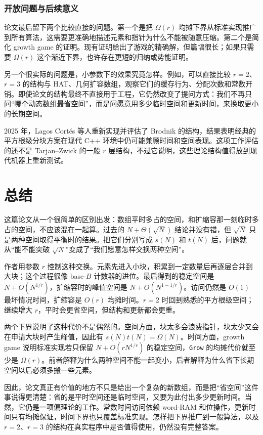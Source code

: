 \documentclass[12pt,a4paper]{article}
\begin{document}
\subsubsection{开放问题与后续意义}

论文最后留下两个比较直接的问题\cite{tarjan2023optimalresizablearrays}。第一个是把 $\Omega(r)$ 均摊下界从标准实现推广到所有算法，这需要更准确地描述元素和指针为什么不能被随意压缩。第二个是简化 growth game 的证明。现有证明给出了游戏的精确解，但篇幅很长；如果只需要 $\Omega(r)$ 这个渐近下界，也许存在更短的归纳或势能证明。

另一个很实际的问题是，小参数下的效果究竟怎样。例如，可以直接比较 $r=2$、$r=3$ 的结构与 HAT、几何扩容数组，观察它们的缓存行为、分配次数和常数开销。即使论文的结构最终不直接用于工程，它仍然改变了提问方式：我们不再只问“哪个动态数组最省空间”，而是问愿意用多少临时空间和更新时间，来换取更小的长期空间。

2025 年，Lagos Cortés 等人重新实现并评估了 Brodnik 的结构，结果表明经典的平方根级分块方案在现代 C++ 环境中仍可能兼顾时间和空间表现\cite{lagos2025brodnik}。这项工作评估的还不是 Tarjan--Zwick 的一般 $r$ 层结构，不过它说明，这些理论结构值得放到现代机器上重新测试。


\section{总结}

这篇论文从一个很简单的区别出发：数组平时多占的空间，和扩缩容那一刻临时多占的空间，不应该混在一起算。过去的 $N+\Theta(\sqrt{N})$ 结论并没有错，但 $\sqrt{N}$ 只是两种空间取得平衡时的结果。把它们分别写成 $s(N)$ 和 $t(N)$ 后，问题就从“能不能突破 $\sqrt{N}$”变成了“我们愿意怎样交换两种空间”\cite{tarjan2023optimalresizablearrays}。

作者用参数 $r$ 控制这种交换。元素先进入小块，积累到一定数量后再逐层合并到大块；这个过程很像 base-$B$ 计数器的进位。最后得到的稳定空间是 $N+O(N^{1/r})$，扩缩容时的峰值空间是 $N+O(N^{1-1/r})$。访问仍然是 $O(1)$ 最坏情况时间，扩缩容是 $O(r)$ 均摊时间。$r=2$ 时回到熟悉的平方根级空间；继续增大 $r$，平时会更省空间，但结构和更新都会更重。

两个下界说明了这种代价不是偶然的。空间方面，块太多会浪费指针，块太少又会在申请大块时产生峰值，因此有 $s(N)t(N)=\Omega(N)$。时间方面，growth game 说明标准实现若只保留 $N+O(rN^{1/r})$ 的稳定空间，\texttt{Grow} 的均摊代价就至少是 $\Omega(r)$。前者解释为什么两种空间不能一起变小，后者解释为什么省下长期空间以后必须多搬一些元素。

因此，论文真正有价值的地方不只是给出一个复杂的新数组，而是把“省空间”这件事说得更清楚：省的是平时空间还是临时空间，又要为此付出多少更新时间。当然，它仍是一项偏理论的工作。常数时间访问依赖 word-RAM 和位操作，更新时间只有均摊保证，时间下界也只覆盖标准实现。怎样把下界推广到一般算法，以及 $r=2$、$r=3$ 的结构在真实程序中是否值得使用，仍然没有完整答案。




\end{document}
